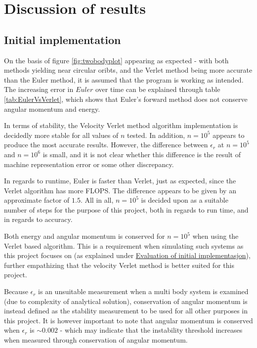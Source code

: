 \documentclass[%
oneside,                 %
final,                   %
10pt]{article}
\begin{document}
\section{Discussion of results}
\subsection{Initial implementation}
\label{subsec:Discofres:initimpl}

On the basis of figure \ref{fig:twobodyplot} appearing as expected - with both methods yielding near circular oribts, and the Verlet method being more accurate than the Euler method, it is assumed that the program is working as intended. The increasing error in $Euler$ over time can be explained through table \ref{tab:EulerVsVerlet}, which shows that Euler's forward method does not conserve angular momentum and energy. \newline

In terms of stability, the Velocity Verlet method algorithm implementation is decidedly more stable for all values of $n$ tested. In addition, $n=10^5$ appears to produce the most accurate results. However, the difference between $\epsilon_r$ at $n=10^5$ and $n=10^6$ is small, and it is not clear whether this difference is the result of machine representation error or some other discrepancy.\newline

In regards to runtime, Euler is faster than Verlet, just as expected, since the Verlet algorithm has more FLOPS. The difference appears to be given by an approximate factor of $1.5$. All in all, $n=10^5$ is decided upon as a suitable number of steps for the purpose of this project, both in regards to run time, and in regards to accuracy.\newline

Both energy and angular momentum is conserved for $n=10^5$ when using the Verlet based algorithm. This is a requirement when simulating such systems as this project focuses on (as explained under \hyperref[subsec:ev_of_init_impl]{Evaluation of initial implementasjon}), further empathizing that the velocity Verlet method is better suited for this project. \newlin

Because $\epsilon_r$ is an unsuitable measurement when a multi body system is examined (due to complexity of analytical solution), conservation of angular momentum is instead defined as the stability measurement to be used for all other purposes in this project. It is however important to note that angular momentum is conserved when $\epsilon_r$ is $\sim 0.002$ - which may indicate that the instability threshold increases when measured through conservation of angular momentum. 
\end{document}
